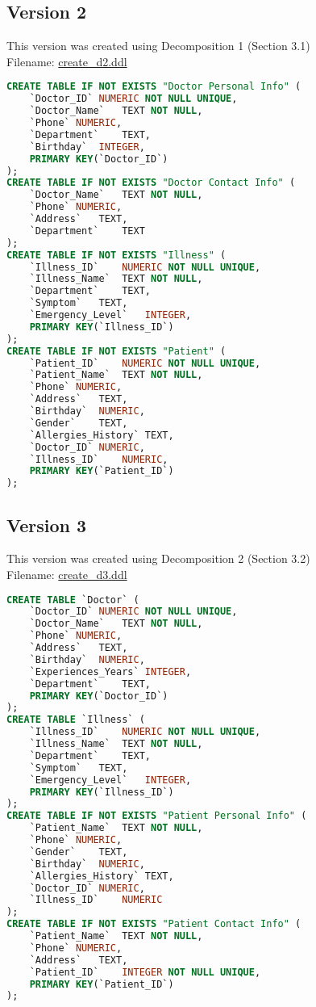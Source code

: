 \documentclass[12pt,arial]{article}
\begin{document}
\subsection{Version 2}
This version was created using Decomposition 1 (Section 3.1)\\
Filename: \url{create_d2.ddl}
\begin{lstlisting}[language=SQL]
CREATE TABLE IF NOT EXISTS "Doctor Personal Info" (
	`Doctor_ID`	NUMERIC NOT NULL UNIQUE,
	`Doctor_Name`	TEXT NOT NULL,
	`Phone`	NUMERIC,
	`Department`	TEXT,
	`Birthday`	INTEGER,
	PRIMARY KEY(`Doctor_ID`)
);
CREATE TABLE IF NOT EXISTS "Doctor Contact Info" (
	`Doctor_Name`	TEXT NOT NULL,
	`Phone`	NUMERIC,
	`Address`	TEXT,
	`Department`	TEXT
);
CREATE TABLE IF NOT EXISTS "Illness" (
	`Illness_ID`	NUMERIC NOT NULL UNIQUE,
	`Illness_Name`	TEXT NOT NULL,
	`Department`	TEXT,
	`Symptom`	TEXT,
	`Emergency_Level`	INTEGER,
	PRIMARY KEY(`Illness_ID`)
);
CREATE TABLE IF NOT EXISTS "Patient" (
	`Patient_ID`	NUMERIC NOT NULL UNIQUE,
	`Patient_Name`	TEXT NOT NULL,
	`Phone`	NUMERIC,
	`Address`	TEXT,
	`Birthday`	NUMERIC,
	`Gender`	TEXT,
	`Allergies_History`	TEXT,
	`Doctor_ID`	NUMERIC,
	`Illness_ID`	NUMERIC,
	PRIMARY KEY(`Patient_ID`)
);
\end{lstlisting}
\subsection{Version 3}
This version was created using Decomposition 2 (Section 3.2)\\
Filename: \url{create_d3.ddl}
\begin{lstlisting}[language=SQL]
CREATE TABLE `Doctor` (
	`Doctor_ID`	NUMERIC NOT NULL UNIQUE,
	`Doctor_Name`	TEXT NOT NULL,
	`Phone`	NUMERIC,
	`Address`	TEXT,
	`Birthday`	NUMERIC,
	`Experiences_Years`	INTEGER,
	`Department`	TEXT,
	PRIMARY KEY(`Doctor_ID`)
);
CREATE TABLE `Illness` (
	`Illness_ID`	NUMERIC NOT NULL UNIQUE,
	`Illness_Name`	TEXT NOT NULL,
	`Department`	TEXT,
	`Symptom`	TEXT,
	`Emergency_Level`	INTEGER,
	PRIMARY KEY(`Illness_ID`)
);
CREATE TABLE IF NOT EXISTS "Patient Personal Info" (
	`Patient_Name`	TEXT NOT NULL,
	`Phone`	NUMERIC,
	`Gender`	TEXT,
	`Birthday`	NUMERIC,
	`Allergies_History`	TEXT,
	`Doctor_ID`	NUMERIC,
	`Illness_ID`	NUMERIC
);
CREATE TABLE IF NOT EXISTS "Patient Contact Info" (
	`Patient_Name`	TEXT NOT NULL,
	`Phone`	NUMERIC,
	`Address`	TEXT,
	`Patient_ID`	INTEGER NOT NULL UNIQUE,
	PRIMARY KEY(`Patient_ID`)
);

\end{lstlisting}
\end{document}
